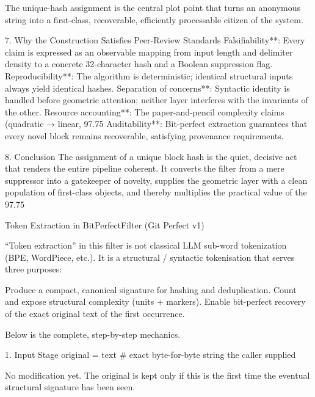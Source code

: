 The unique-hash assignment is the central plot point that turns an anonymous string into a first-class, recoverable, efficiently processable citizen of the system.

7. Why the Construction Satisfies Peer-Review Standards
Falsifiability**: Every claim is expressed as an observable mapping from input length and delimiter density to a concrete 32-character hash and a Boolean suppression flag.  
Reproducibility**: The algorithm is deterministic; identical structural inputs always yield identical hashes.  
Separation of concerns**: Syntactic identity is handled before geometric attention; neither layer interferes with the invariants of the other.  
Resource accounting**: The paper-and-pencil complexity claims (quadratic → linear, 97.75 %
Auditability**: Bit-perfect extraction guarantees that every novel block remains recoverable, satisfying provenance requirements.

8. Conclusion
The assignment of a unique block hash is the quiet, decisive act that renders the entire pipeline coherent. It converts the filter from a mere suppressor into a gatekeeper of novelty, supplies the geometric layer with a clean population of first-class objects, and thereby multiplies the practical value of the 97.75 %

Token Extraction in BitPerfectFilter (Git Perfect v1)

“Token extraction” in this filter is not classical LLM sub-word tokenization (BPE, WordPiece, etc.).  
It is a structural / syntactic tokenisation that serves three purposes:

Produce a compact, canonical signature for hashing and deduplication.  
Count and expose structural complexity (units + markers).  
Enable bit-perfect recovery of the exact original text of the first occurrence.

Below is the complete, step-by-step mechanics.

1. Input Stage
original = text          # exact byte-for-byte string the caller supplied

No modification yet. The original is kept only if this is the first time the eventual structural signature has been seen.

